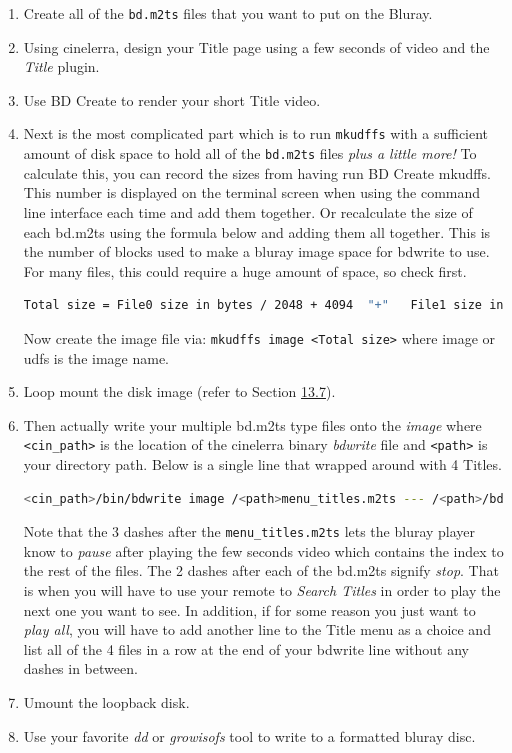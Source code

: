 \begin{enumerate}
    \item Create all of the \texttt{bd.m2ts} files that you want to put on the Bluray.
    \item Using cinelerra, design your Title page using a few seconds of video and the \textit{Title} plugin.
    \item Use BD Create to render your short Title video.
    \item Next is the most complicated part which is to run \texttt{mkudffs} with a sufficient amount of disk space to hold all of the \texttt{bd.m2ts} files \textit{plus a little more!}  To calculate this, you can record the sizes from having run BD Create mkudffs.  This number is displayed on the terminal screen when using the command line interface each time and add them together.  Or recalculate the size of each bd.m2ts using the formula below and adding them all together.  This is the number of blocks used to make a bluray image space for bdwrite to use.  For many files, this could require a huge amount of space, so check first.
    \begin{lstlisting}[language=bash,numbers=none]
    Total size = File0 size in bytes / 2048 + 4094  "+"   File1 size in bytes / 2048 + 4094  "+" ...
    \end{lstlisting}
    Now create the image file via:   \texttt{mkudffs image <Total size>}  where image or udfs is the image name.
    \item Loop mount the disk image (refer to Section \hyperref[sec:bluray_workaround_mount_umount]{13.7}).
    \item Then actually write your multiple bd.m2ts type files onto the \textit{image} where \texttt{<cin\_path>} is the location of the cinelerra binary \textit{bdwrite} file and \texttt{<path>} is your directory path.  Below is a single line that wrapped around with 4 Titles.
    \begin{lstlisting}[language=bash,numbers=none]
    <cin_path>/bin/bdwrite image /<path>menu_titles.m2ts --- /<path>/bd1.m2ts -- /<path>/bd2.m2ts -- /<path>/bd3.m2ts -- /<path>bd4.m2ts
    \end{lstlisting}
    Note that the 3 dashes after the \texttt{menu\_titles.m2ts} lets the bluray player know to \textit{pause} after playing the few seconds video which contains the index to the rest of the files.  The 2 dashes after each of the bd.m2ts signify \textit{stop}.  That is when you will have to use your remote to \textit{Search Titles} in order to play the next one you want to see.  In addition, if for some reason you just want to \textit{play all}, you will have to add another line to the Title menu as a choice and list all of the 4 files in a row at the end of your bdwrite line without any dashes in between.
    \item Umount the loopback disk.
    \item Use your favorite \textit{dd} or \textit{growisofs} tool to write to a formatted bluray disc.
\end{enumerate}

